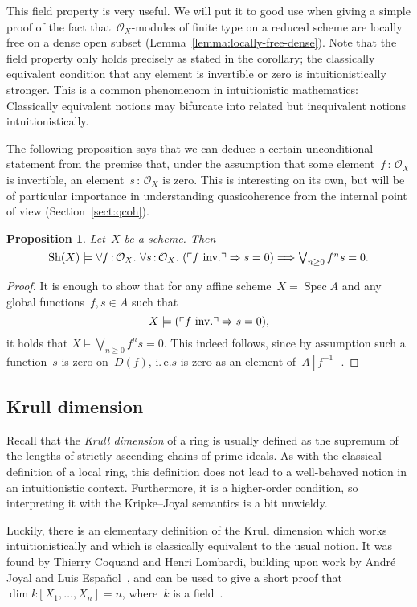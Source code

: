 \documentclass[10pt]{amsart}
\makeatletter
\theoremstyle{definition}
\theoremstyle{plain}
\newtheorem{prop}[defn]{Proposition}
\theoremstyle{remark}
\renewcommand{\O}{\mathcal{O}}
\newcommand{\Sh}{\mathrm{Sh}}
\DeclareMathOperator{\Spec}{Spec}
\newcommand{\?}{\,{:}\,}
\renewcommand{\_}{\mathpunct{.}\,}
\newcommand{\speak}[1]{\ulcorner\text{\textnormal{#1}}\urcorner}
\newcommand{\ie}{i.\,e.\@\xspace}
\newcommand{\inv}{inv.\@}
\makeatother
\begin{document}
This field property is very useful. We will put it to good use when giving a
simple proof of the fact that~$\O_X$-modules of finite type on a reduced scheme
are locally free on a dense open subset (Lemma~\ref{lemma:locally-free-dense}).
Note that the field property only holds precisely as stated in the corollary;
the classically equivalent condition that any element is invertible or zero is
intuitionistically stronger. This is a common phenomenom in intuitionistic
mathematics: Classically equivalent notions may bifurcate into related but
inequivalent notions intuitionistically.

The following proposition says that we can deduce a certain unconditional
statement from the premise that, under the assumption that some element~$f\?\O_X$ is invertible, an element~$s\?\O_X$ is zero. This is
interesting on its own, but will be of particular importance in understanding
quasicoherence from the internal point of view (Section~\ref{sect:qcoh}).

\begin{prop}\label{prop:cond-zero}
Let~$X$ be a scheme. Then
\[ \Sh(X) \models
  \forall f\?\O_X\_
  \forall s\?\O_X\_
  (\speak{$f$ \inv} \Rightarrow s = 0) \Longrightarrow
  \textstyle
  \bigvee_{n \geq 0} f^n s = 0. \]
\end{prop}
\begin{proof}It is enough to show that for any affine scheme~$X = \Spec A$ and
any global functions~$f, s \in A$ such that
\[ X \models (\speak{$f$ \inv} \Rightarrow s = 0), \]
it holds that $X \models \textstyle \bigvee_{n \geq 0} f^n s = 0$. This
indeed follows, since by assumption such a function~$s$ is zero on~$D(f)$, \ie $s$
is zero as an element of~$A[f^{-1}]$.
\end{proof}


\subsection{Krull dimension}\label{sect:krull-dimension}
Recall that the \emph{Krull dimension} of a
ring is usually defined as the supremum of the lengths of strictly
ascending chains of prime ideals. As with the classical definition of a local ring,
this definition does not lead to a well-behaved notion in an intuitionistic
context. Furthermore, it is a higher-order condition, so interpreting it
with the Kripke--Joyal semantics is a bit unwieldy.

Luckily, there is an elementary definition of the Krull dimension which works
intuitionistically and which is classically equivalent to the usual notion. It
was found by Thierry Coquand and Henri Lombardi, building upon work by André
Joyal and Luis Español~\cite{dyn:krull-integral,dyn:char-krull}, and can be
used to give a short proof that~$\dim k[X_1,\ldots,X_n] = n$, where~$k$ is a
field~\cite{dyn:krull-dim-polynomial-ring}.
\end{document}
